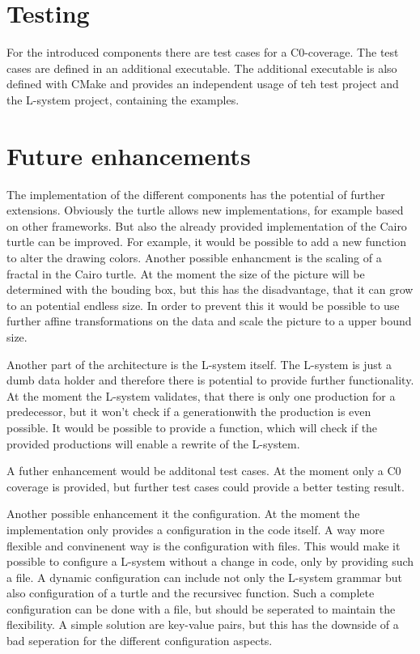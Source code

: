 \documentclass[english]{cpp-hmwk}
\begin{document}
\section{Testing}

For the introduced components there are test cases for a C0-coverage. The test cases are defined in an additional executable. The additional executable is also defined with CMake and provides an independent usage of teh test project and the L-system project, containing the examples.

\section{Future enhancements}

The implementation of the different components has the potential of further extensions. Obviously the turtle allows new implementations, for example based on other frameworks. But also the already provided implementation of the Cairo turtle can be improved. For example, it would be possible to add a new function to alter the drawing colors. Another possible enhancment is the scaling of a fractal in the Cairo turtle. At the moment the size of the picture will be determined with the bouding box, but this has the disadvantage, that it can grow to an potential endless size. In order to prevent this it would be possible to use further affine transformations on the data and scale the picture to a upper bound size.

\noindent Another part of the architecture is the L-system itself. The L-system is just a dumb data holder and therefore there is potential to provide further functionality. At the moment the L-system validates, that there is only one production for a predecessor, but it won't check if a generationwith the production is even possible. It would be possible to provide a function, which will check if the provided productions will enable a rewrite of the L-system. 

\noindent A futher enhancement would be additonal test cases. At the moment only a C0 coverage is provided, but further test cases could provide a better testing result.

\noindent Another possible enhancement it the configuration. At the moment the implementation only provides a configuration in the code itself. A way more flexible and convinenent way is the configuration with files. This would make it possible to configure a L-system without a change in code, only by providing such a file. A dynamic configuration can include not only the L-system grammar but also configuration of a turtle and the recursivec function. Such a complete configuration can be done with a file, but should be seperated to maintain the flexibility. A simple solution are key-value pairs, but this has the downside of a bad seperation for the different configuration aspects.
\end{document}
